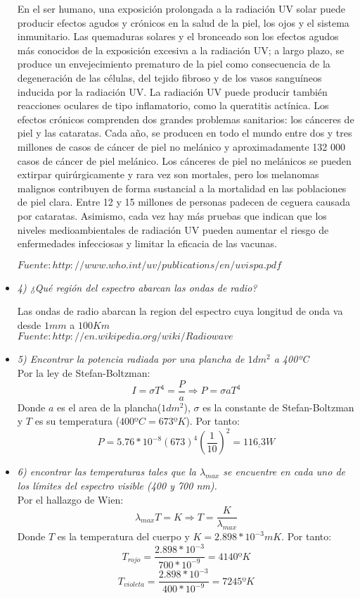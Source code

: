 \documentclass{article}
\begin{document}
\begin{itemize}
En el ser humano, una exposición prolongada a la radiación UV solar puede producir efectos agudos y crónicos en la salud de la piel, los ojos y el sistema inmunitario. Las quemaduras solares y el bronceado son los efectos agudos más conocidos de la exposición excesiva a la radiación UV; a largo plazo, se produce un envejecimiento prematuro de la piel como consecuencia de la degeneración de las células, del tejido fibroso y de los vasos sanguíneos inducida por la radiación UV. La radiación UV puede producir también reacciones oculares de tipo inflamatorio, como la queratitis actínica.
Los efectos crónicos comprenden dos grandes problemas sanitarios: los cánceres de piel y las cataratas. Cada año, se producen en todo el mundo entre dos y tres millones de casos de cáncer de piel no melánico y aproximadamente 132 000 casos de cáncer de piel melánico. Los cánceres de piel no melánicos se pueden extirpar quirúrgicamente y rara vez son mortales, pero los melanomas malignos contribuyen de forma sustancial a la mortalidad en las poblaciones de piel clara. Entre 12 y 15 millones de personas padecen de ceguera causada por cataratas. Asimismo, cada vez hay más pruebas que indican que los niveles medioambientales de radiación UV pueden aumentar el riesgo de enfermedades infecciosas y limitar la eficacia de las vacunas.

$Fuente: http://www.who.int/uv/publications/en/uvispa.pdf$
\item \textit{4) ¿Qué región del espectro abarcan las ondas de radio?}


Las ondas de radio abarcan la region del espectro cuya longitud de onda va desde $1mm$ a $100Km$ \\
$Fuente: http://en.wikipedia.org/wiki/Radiowave$

\item \textit{5) Encontrar la potencia radiada por una plancha de $1dm^2$ a 400ºC} \\
Por la ley de Stefan-Boltzman:
$$I=\sigma T^{4}=\frac{P}{a} \Rightarrow P= \sigma a T^{4} $$
Donde $a$ es el area de la plancha($1dm^2$), $ \sigma $ es la constante de Stefan-Boltzman y $T$ es su temperatura ($400ºC= 673ºK$). Por tanto: $$P= 5.76*10^{-8}(673)^{4} \left( \frac{1}{10}\right) ^{2}= \underline{116.3 W} $$

\item \textit{6) encontrar las temperaturas tales que la $ \lambda_{max}$ se encuentre en cada uno de los límites del espectro visible (400 y 700 nm). } \\
Por el hallazgo de Wien: $$ \lambda_{max} T=K \Rightarrow T=\frac{K}{ \lambda_{max}}$$ Donde $T$ es la temperatura del cuerpo y $K=2.898*10^{-3} mK$. Por tanto: $$T_{rojo}=\frac{2.898*10^{-3}}{700*10^{-9}}= 4140ºK $$ $$ T_{violeta}=\frac{2.898*10^{-3}}{400*10^{-9}}= 7245ºK$$


\end{itemize}
\end{document}
